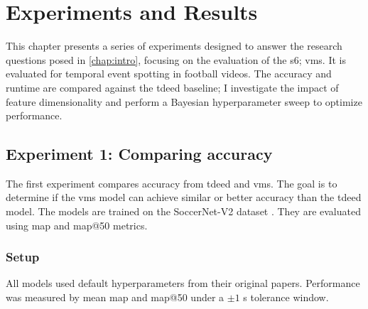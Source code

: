 \chapter{Experiments and Results}
\label{chap:experiments}
This chapter presents a series of experiments designed to answer the research questions posed in \autoref{chap:intro}, focusing on the evaluation of the \acrfull{s6}; \acrfull{vms}. It is evaluated for temporal event spotting in football videos. The accuracy and runtime are compared against the \acrfull{tdeed} baseline; I investigate the impact of feature dimensionality and perform a Bayesian hyperparameter sweep to optimize performance.


\section{Experiment 1: Comparing accuracy}
\label{sec:experiment1}
The first experiment compares accuracy from \acrfull{tdeed} and \acrfull{vms}. The goal is to determine if the \acrshort{vms} model can achieve similar or better accuracy than the \acrshort{tdeed} model. The models are trained on the SoccerNet-V2 dataset \cite{deliege_soccernet-v2_dataset_2021}. They are evaluated using \acrfull{map} and \acrshort{map}@50 metrics.

\subsection{Setup}
\label{ssec:ex1_setup}

All models used default hyperparameters from their original papers. Performance was measured by mean \acrfull{map} and \acrshort{map}@50 under a \(\pm1\) s tolerance window.


